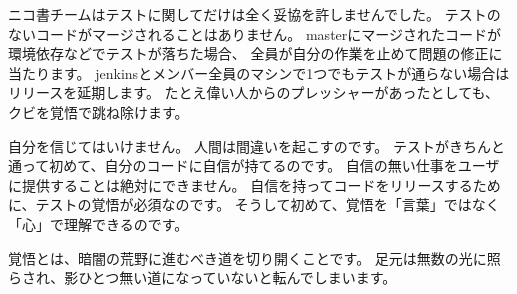 ニコ書チームはテストに関してだけは全く妥協を許しませんでした。
テストのないコードがマージされることはありません。
masterにマージされたコードが環境依存などでテストが落ちた場合、
全員が自分の作業を止めて問題の修正に当たります。
jenkinsとメンバー全員のマシンで1つでもテストが通らない場合はリリースを延期します。
たとえ偉い人からのプレッシャーがあったとしても、クビを覚悟で跳ね除けます。

自分を信じてはいけません。 人間は間違いを起こすのです。
テストがきちんと通って初めて、自分のコードに自信が持てるのです。
自信の無い仕事をユーザに提供することは絶対にできません。
自信を持ってコードをリリースするために、テストの覚悟が必須なのです。
そうして初めて、覚悟を「言葉」ではなく「心」で理解できるのです。

覚悟とは、暗闇の荒野に進むべき道を切り開くことです。
足元は無数の光に照らされ、影ひとつ無い道になっていないと転んでしまいます。
